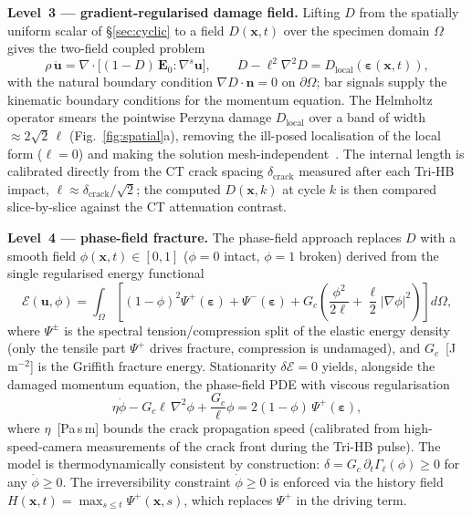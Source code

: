 \documentclass[11pt]{article}
\begin{document}
\textbf{Level~3 --- gradient-regularised damage field.}
Lifting $D$ from the spatially uniform scalar of \S\ref{sec:cyclic} to a field
$D(\mathbf{x},t)$ over the specimen domain $\Omega$ gives the two-field coupled problem
\begin{equation}
\rho\,\ddot{\mathbf{u}}=\nabla\cdot\big[(1-D)\,\mathbf{E}_0:\nabla^s\mathbf{u}\big],
\qquad
D-\ell^2\nabla^2 D=D_{\mathrm{local}}\!\left(\boldsymbol\varepsilon(\mathbf{x},t)\right),
\label{eq:gradD}
\end{equation}
with the natural boundary condition $\nabla D\cdot\mathbf{n}=0$ on $\partial\Omega$;
bar signals supply the kinematic boundary conditions for the momentum equation.  The
Helmholtz operator smears the pointwise Perzyna damage $D_{\mathrm{local}}$ over a
band of width ${\approx}2\sqrt{2}\,\ell$ (Fig.~\ref{fig:spatial}a), removing the
ill-posed localisation of the local form ($\ell=0$) and making the solution
mesh-independent~\citep{pijaudier1987}.  The internal length is calibrated directly
from the CT crack spacing $\delta_{\mathrm{crack}}$ measured after each Tri-HB
impact, $\ell\approx\delta_{\mathrm{crack}}/\sqrt{2}$; the computed $D(\mathbf{x},k)$
at cycle $k$ is then compared slice-by-slice against the CT attenuation contrast.

\textbf{Level~4 --- phase-field fracture.}
The phase-field approach replaces $D$ with a smooth field $\phi(\mathbf{x},t)\in[0,1]$
($\phi=0$ intact, $\phi=1$ broken) derived from the single regularised energy
functional~\citep{bourdin2000}
\begin{equation}
\mathcal{E}(\mathbf{u},\phi)=\int_\Omega\!\left[(1-\phi)^2\Psi^+(\boldsymbol\varepsilon)
+\Psi^-(\boldsymbol\varepsilon)
+G_c\!\left(\frac{\phi^2}{2\ell}+\frac{\ell}{2}|\nabla\phi|^2\right)\right]d\Omega,
\label{eq:pf}
\end{equation}
where $\Psi^\pm$ is the spectral tension/compression split of the elastic energy
density (only the tensile part $\Psi^+$ drives fracture, compression is
undamaged), and $G_c$~[J\,m$^{-2}$] is the Griffith fracture energy.  Stationarity
$\delta\mathcal{E}=0$ yields, alongside the damaged momentum equation, the
phase-field PDE with viscous regularisation
\begin{equation}
\eta\dot\phi - G_c\ell\,\nabla^2\phi+\frac{G_c}{\ell}\phi
=2(1-\phi)\,\Psi^+(\boldsymbol\varepsilon),
\label{eq:pfpde}
\end{equation}
where $\eta$~[Pa\,s\,m] bounds the crack propagation speed (calibrated from
high-speed-camera measurements of the crack front during the Tri-HB pulse).  The
model is thermodynamically consistent by construction:
$\delta=G_c\,\partial_t\Gamma_\ell(\phi)\ge0$ for any $\dot\phi\ge0$.  The
irreversibility constraint $\dot\phi\ge0$ is enforced via the history field
$H(\mathbf{x},t)=\max_{s\le t}\Psi^+(\mathbf{x},s)$, which replaces $\Psi^+$ in
the driving term.
\end{document}
